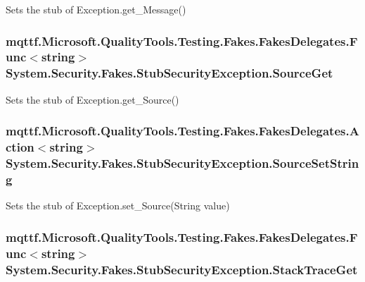 Sets the stub of Exception.\-get\-\_\-\-Message()

\hypertarget{class_system_1_1_security_1_1_fakes_1_1_stub_security_exception_af450f2f907b181927fa6e557a7434961}{
\subsubsection[{Source\-Get}]{\setlength{\rightskip}{0pt plus 5cm}mqttf.\-Microsoft.\-Quality\-Tools.\-Testing.\-Fakes.\-Fakes\-Delegates.\-Func$<$string$>$ System.\-Security.\-Fakes.\-Stub\-Security\-Exception.\-Source\-Get}}\label{class_system_1_1_security_1_1_fakes_1_1_stub_security_exception_af450f2f907b181927fa6e557a7434961}


Sets the stub of Exception.\-get\-\_\-\-Source()

\hypertarget{class_system_1_1_security_1_1_fakes_1_1_stub_security_exception_a62cb50dce0a6868e7fcac82247f71177}{
\subsubsection[{Source\-Set\-String}]{\setlength{\rightskip}{0pt plus 5cm}mqttf.\-Microsoft.\-Quality\-Tools.\-Testing.\-Fakes.\-Fakes\-Delegates.\-Action$<$string$>$ System.\-Security.\-Fakes.\-Stub\-Security\-Exception.\-Source\-Set\-String}}\label{class_system_1_1_security_1_1_fakes_1_1_stub_security_exception_a62cb50dce0a6868e7fcac82247f71177}


Sets the stub of Exception.\-set\-\_\-\-Source(\-String value)

\hypertarget{class_system_1_1_security_1_1_fakes_1_1_stub_security_exception_ad8127036028763b5918d5c54f27e218c}{
\subsubsection[{Stack\-Trace\-Get}]{\setlength{\rightskip}{0pt plus 5cm}mqttf.\-Microsoft.\-Quality\-Tools.\-Testing.\-Fakes.\-Fakes\-Delegates.\-Func$<$string$>$ System.\-Security.\-Fakes.\-Stub\-Security\-Exception.\-Stack\-Trace\-Get}}\label{class_system_1_1_security_1_1_fakes_1_1_stub_security_exception_ad8127036028763b5918d5c54f27e218c}


